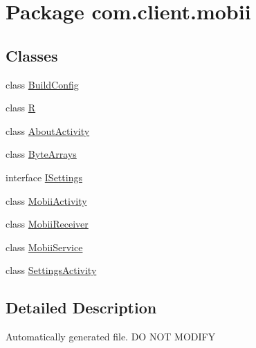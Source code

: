 \hypertarget{namespacecom_1_1client_1_1mobii}{\section{Package com.\-client.\-mobii}
\label{namespacecom_1_1client_1_1mobii}
}
\subsection*{Classes}
\begin{DoxyCompactItemize}
\item 
class \hyperlink{classcom_1_1client_1_1mobii_1_1_build_config}{Build\-Config}
\item 
class \hyperlink{classcom_1_1client_1_1mobii_1_1_r}{R}
\item 
class \hyperlink{classcom_1_1client_1_1mobii_1_1_about_activity}{About\-Activity}
\item 
class \hyperlink{classcom_1_1client_1_1mobii_1_1_byte_arrays}{Byte\-Arrays}
\item 
interface \hyperlink{interfacecom_1_1client_1_1mobii_1_1_i_settings}{I\-Settings}
\item 
class \hyperlink{classcom_1_1client_1_1mobii_1_1_mobii_activity}{Mobii\-Activity}
\item 
class \hyperlink{classcom_1_1client_1_1mobii_1_1_mobii_receiver}{Mobii\-Receiver}
\item 
class \hyperlink{classcom_1_1client_1_1mobii_1_1_mobii_service}{Mobii\-Service}
\item 
class \hyperlink{classcom_1_1client_1_1mobii_1_1_settings_activity}{Settings\-Activity}
\end{DoxyCompactItemize}


\subsection{Detailed Description}
Automatically generated file. D\-O N\-O\-T M\-O\-D\-I\-F\-Y 